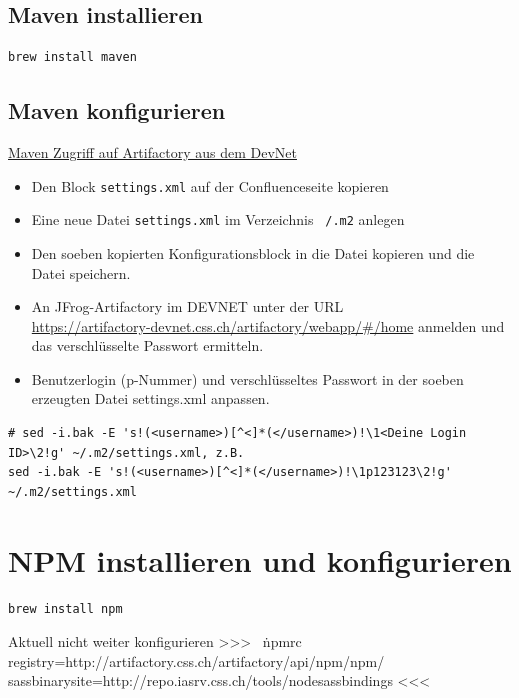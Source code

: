 \documentclass[]{article}
\newcommand{\code}[1]{\texttt{#1}}
\begin{document}
\subsection{Maven installieren}
\begin{verbatim}
brew install maven
\end{verbatim}

\subsection{Maven konfigurieren}
\href{https://confluence.css.ch/confluence/display/TEA/Maven+Zugriff+auf+Artifactory+aus+dem+DevNet}{Maven Zugriff auf Artifactory aus dem DevNet}
\begin{itemize}
	\item Den Block \code{settings.xml} auf der Confluenceseite kopieren
	\item Eine neue Datei \code{settings.xml} im Verzeichnis \code{~/.m2} anlegen
	\item Den soeben kopierten Konfigurationsblock in die Datei kopieren und die Datei speichern.
	\item An JFrog-Artifactory im DEVNET unter der URL \\
	\url{https://artifactory-devnet.css.ch/artifactory/webapp/#/home}
	anmelden und das verschlüsselte Passwort ermitteln.
	\item Benutzerlogin (p-Nummer) und verschlüsseltes Passwort in der soeben erzeugten Datei settings.xml anpassen.
\end{itemize}

\begin{verbatim}
# sed -i.bak -E 's!(<username>)[^<]*(</username>)!\1<Deine Login ID>\2!g' ~/.m2/settings.xml, z.B.
sed -i.bak -E 's!(<username>)[^<]*(</username>)!\1p123123\2!g' ~/.m2/settings.xml
\end{verbatim}



\section{NPM installieren und konfigurieren}
\begin{verbatim}
brew install npm
\end{verbatim}

Aktuell nicht weiter konfigurieren >>>
~\.npmrc
registry=http://artifactory.css.ch/artifactory/api/npm/npm/
sass\textunderscore binary\textunderscore site=http://repo.iasrv.css.ch/tools/node\textunderscore sass\textunderscore bindings
<<<
\end{document}
